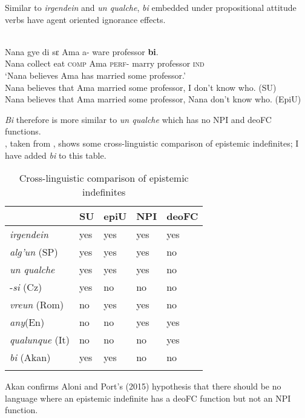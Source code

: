 \documentclass[output=paper,modfonts,nonflat,draftmode]{langsci/langscibook}
\begin{document}
Similar to \emph{irgendein} and \emph{un qualche}, \emph{bi} embedded under propositional attitude verbs have agent oriented ignorance effects.  

 \ea\label{owusu:ex42c}\\
 \gll  Nana gye di sε Ama a- ware professor \textbf{bi}. \\
Nana collect eat \textsc{comp} Ama \textsc{perf}- marry professor \textsc{ind}\\
\glt `Nana believes Ama has married some professor.' \\
Nana believes that Ama married some professor, I don't know who. (SU)\\
Nana believes that Ama married some professor, Nana don't know who. (EpiU)
\z 

\emph{Bi} therefore is more similar to \emph{un qualche} which has no NPI and deoFC functions. \\
 , taken from \citet{AloniPort2015}, shows some cross-linguistic comparison of epistemic indefinites; I have added \emph{bi} to this table.\\

\begin{table}
\caption{Cross-linguistic comparison of epistemic indefinites}
	\begin{tabularx}{.8\textwidth}{lXXXX}
		\lsptoprule
		{}		& SU		& 	epiU & NPI & deoFC \\ 
		\midrule 
		\emph{irgendein} 			& yes 		& 	yes	& 	yes	& 	yes	\\ 
		\emph{alg'un} (SP)        & yes 	 	& 	yes 	& 	yes & 	no		\\ 
		 \emph{un qualche} 		& yes 	 	& 	yes 	& 	yes & 	no \\		
		-\emph{si} (Cz)	& 	yes	& 	no &	 no & no			\\ 
		\emph{vreun} (Rom) 		& no	 	& 	yes 	& 	yes & 	no \\			
		\emph{any}(En) 		& no 	 	& 	no 	& 	yes & 	yes \\			
		\emph{qualunque} (It)		& no	 	& 	no 	& 	no & 	yes \\		
		\emph{bi} (Akan) 		& yes 	 	& 	yes 	& 	no & 	no \\		
		\lspbottomrule
	\end{tabularx}
	\label{tab:owusu:1}
    \end{table}
    
Akan confirms Aloni and Port's (2015) hypothesis that there should be no language where an epistemic indefinite has a deoFC function but not an NPI function. 
\end{document}
